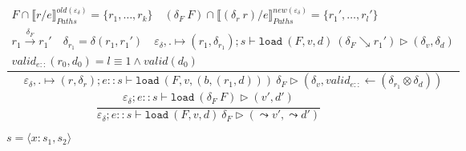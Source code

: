\documentclass[10pt,twoside,a4paper]{article}
\theoremstyle{theorem}
\theoremstyle{lemma}
\theoremstyle{property}
\begin{document}
\begin{displaymath}
	\frac{\begin{array}{c}
		F \cap \llbracket r/e \rrbracket^{old(\varepsilon_\delta)}_{Paths} = \{r_1,\dots,r_k\} \quad
		(\delta_F~F) \cap \llbracket (\delta_r ~ r)/e \rrbracket^{new(\varepsilon_\delta)}_{Paths} = \{r_1',\dots,r_l'\} \\
		r_1 \xrightarrow{\delta_F} r_1' \quad \delta_{r_1} = \delta(r_1,r_1') \quad
		\varepsilon_\delta, . \mapsto (r_1,\delta_{r_1}) ; s \vdash \mathtt{load}~ (F,v,d)~ (\delta_F \searrow r_1') \rhd (\delta_v,\delta_d)\\
		valid_{e::} (r_0,d_0) = l \equiv 1 \wedge valid(d_0)
	\end{array}}
	{\varepsilon_\delta, . \mapsto (r,\delta_r) ; e::s \vdash \mathtt{load}~ (F,v,(b,(r_1,d)))~ \delta_F \rhd (\delta_v,valid_{e::} \leftarrow (\delta_{r_1} \otimes \delta_d) )}
\end{displaymath}
\begin{displaymath}
	\frac{\begin{array}{c}
		\varepsilon_\delta ; e :: s \vdash \mathtt{load}~ (\delta_F~F) \rhd (v',d')
	\end{array}}
	{\varepsilon_\delta ; e::s \vdash \mathtt{load}~ (F,v,d)~ \delta_F \rhd (\leadsto v',\leadsto d')}
\end{displaymath}

$\boxed{s = \langle x : s_1, s_2 \rangle}$
\end{document}
